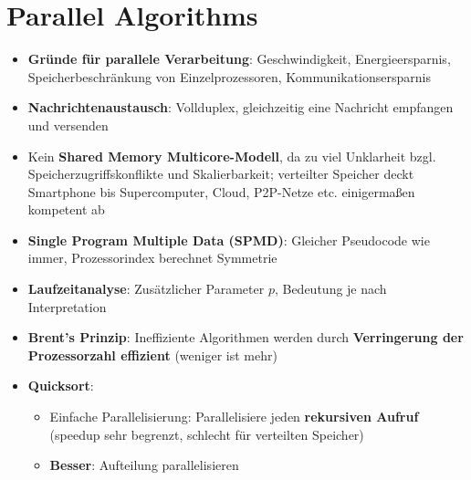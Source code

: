 \section{Parallel Algorithms}%
\label{pa:sec:parallel_algorithms}

\begin{itemize}
	\item \textbf{Gründe für parallele Verarbeitung}: Geschwindigkeit, Energieersparnis, Speicherbeschränkung von Einzelprozessoren, Kommunikationsersparnis
	\item \textbf{Nachrichtenaustausch}: Vollduplex, gleichzeitig eine Nachricht empfangen und versenden
	\item Kein \textbf{Shared Memory Multicore-Modell}, da zu viel Unklarheit bzgl. Speicherzugriffskonflikte und Skalierbarkeit; verteilter Speicher deckt Smartphone bis Supercomputer, Cloud, P2P-Netze etc. einigermaßen kompetent ab
	\item \textbf{Single Program Multiple Data (SPMD)}: Gleicher Pseudocode wie immer, Prozessorindex berechnet Symmetrie
	\item \textbf{Laufzeitanalyse}: Zusätzlicher Parameter $p$, Bedeutung je nach Interpretation
	\item \textbf{Brent's Prinzip}: Ineffiziente Algorithmen werden durch \textbf{Verringerung der Prozessorzahl effizient} (weniger ist mehr)
	\item \textbf{Quicksort}:
	\begin{itemize}
		\item Einfache Parallelisierung: Parallelisiere jeden \textbf{rekursiven Aufruf} (speedup sehr begrenzt, schlecht für verteilten Speicher)
		\item \textbf{Besser}: Aufteilung parallelisieren
	\end{itemize}
\end{itemize}
